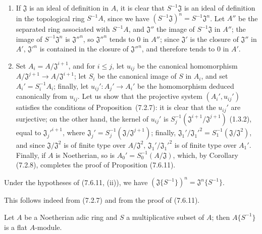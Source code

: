 \begin{enumerate}
  \item[\rm(i)] If $\mathfrak J$ is an ideal of definition in $A$, it is
    clear that $S^{-1}\mathfrak J$ is an ideal of definition in the topological
    ring $S^{-1}A$, since we have
    $(S^{-1}\mathfrak J)^n=S^{-1}\mathfrak J^n$. Let $A''$ be the separated ring
    associated with $S^{-1}A$, and $\mathfrak J''$ the image of $S^{-1}\mathfrak J$ in
    $A''$; the image of $S^{-1}\mathfrak J^n$ is $\mathfrak J''^n$, so
    $\mathfrak J''^n$ tends to 0 in $A''$; since $\mathfrak J'$ is
    the closure of $\mathfrak J''$ in $A'$, $\mathfrak J'^n$ is contained
    in the closure of $\mathfrak J''^n$, and therefore tends to 0 in $A'$.
  \item[\rm(ii)] Set $A_i=A/\mathfrak J^{i+1}$, and for $i\leq j$, let
    $u_{ij}$ be the canonical homomorphism
    $A/\mathfrak J^{j+1}\to A/\mathfrak J^{i+1}$; let $S_i$ be the canonical
    image of $S$ in $A_i$, and set $A_i'=S_i^{-1}A_i$; finally, let
    $u_{ij}':A_j'\to A_i'$ be the homomorphism deduced canonically from $u_{ij}$.
    Let us show that the projective system $(A_i',u_{ij}')$ satisfies the conditions
    of Proposition~(7.2.7): it is clear that the $u_{ij}'$ are surjective;
    on the other hand, the kernel of $u_{ij}'$ is
    $S_j^{-1}(\mathfrak J^{i+1}/\mathfrak J^{j+1})$ (1.3.2), equal to
    $\mathfrak J_j'^{i+1}$, where
    $\mathfrak J_j'=S_j^{-1}(\mathfrak J/\mathfrak J^{j+1})$; finally,
    $\mathfrak J_1'/\mathfrak J_1'^2=S_1^{-1}(\mathfrak J/\mathfrak J^2)$,
    and since $\mathfrak J/\mathfrak J^2$ is of finite type over
    $A/\mathfrak J^2$, $\mathfrak J_1'/\mathfrak J_1'^2$ is of finite type
    over $A_1'$. Finally, if $A$ is Noetherian, so is
    $A_0'=S_0^{-1}(A/\mathfrak J)$, which, by Corollary (7.2.8), completes the proof of Proposition
    (7.6.11).
\end{enumerate}

\begin{corollary}[7.6.12]
\label{0.7.6.12}
Under the hypotheses of \textup{(7.6.11, (ii))}, we have
$(\mathfrak J\{S^{-1}\})^n=\mathfrak J^n\{S^{-1}\}$.
\end{corollary}

This follows indeed from (7.2.7) and from the proof of (7.6.11).

\begin{proposition}[7.6.13]
\label{0.7.6.13}
Let $A$ be a Noetherian adic ring and $S$ a multiplicative subset of $A$;
then $A\{S^{-1}\}$ is a flat $A$-module.
\end{proposition}

